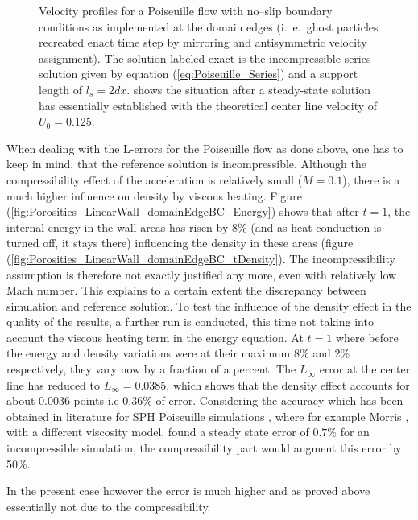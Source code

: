 \documentclass{report}
\begin{document}
\begin{figure}[!htbp]
\caption[Velocity profiles Poiseuille flow]{Velocity profiles for a Poiseuille flow with no--slip boundary conditions as implemented at the domain edges (i.\ e.\ ghost particles recreated enact time step by mirroring and antisymmetric velocity assignment). The solution labeled exact is the incompressible series solution given by equation (\ref{eq:Poiseuille_Series}) and a support length of $l_s=2dx$.   shows the situation after a steady-state solution has essentially established with the theoretical center line velocity of $U_0=0.125$.}

\end{figure}

When dealing with the L-errors for the Poiseuille flow as done above, one has to keep in mind, that the reference solution is incompressible. Although the compressibility effect of the acceleration is relatively small ($M=0.1$), there is a much higher influence on density by viscous heating. Figure (\ref{fig:Porosities_LinearWall_domainEdgeBC_Energy}) shows that after $t=1$, the internal energy in the wall areas has risen by $8\%$ (and as heat conduction is turned off, it stays there) influencing the density in these areas (figure (\ref{fig:Porosities_LinearWall_domainEdgeBC_tDensity}). The incompressibility assumption is therefore not exactly justified any more, even with relatively low Mach number. This explains to a certain extent the discrepancy between simulation and reference solution. To test the influence of the density effect in the quality of the results, a further run is conducted, this time not taking into account the viscous heating term in the energy equation. At $t=1$ where before the energy and density variations were at their maximum 8\% and 2\% respectively, they vary now by a fraction of a percent. The $L_\infty$ error at the center line has reduced to $L_\infty=0.0385$,
which shows that the density effect accounts for about 0.0036 points i.e 0.36\% of error. Considering the accuracy which has been obtained in literature for SPH Poiseuille simulations , where for example Morris \cite{Morris1997}, with a different viscosity model, found a steady state error of $0.7\%$ for an incompressible simulation, the compressibility part would augment this error by 50\%. 

In the present case however the error is much higher and as proved above essentially not due to the compressibility.
\end{document}
